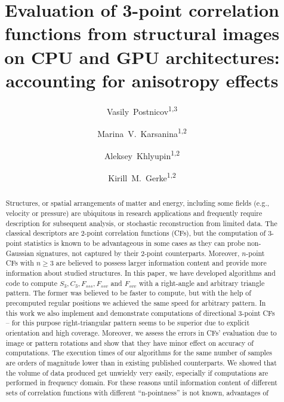 \documentclass[reprint,amsmath,amssymb,aps,pre,showkeys,showpacs]{revtex4-1}
\begin{document}

\author{Vasily~Postnicov\textsuperscript{1,3}}
\author{Marina~V.~Karsanina\textsuperscript{1,2}}
\author{Aleksey~Khlyupin\textsuperscript{1,2}}
\author{Kirill~M.~Gerke\textsuperscript{1,2}}


\title{Evaluation of 3-point correlation functions from structural images on CPU
  and GPU architectures: accounting for anisotropy effects}

\begin{abstract}
Structures, or spatial arrangements of matter and energy, including some fields
(e.g., velocity or pressure) are ubiquitous in research applications and
frequently require description for subsequent analysis, or stochastic
reconstruction from limited data.  The classical descriptors are 2-point
correlation functions (CFs), but the computation of 3-point statistics is known
to be advantageous in some cases as they can probe non-Gaussian signatures, not
captured by their 2-point counterparts. Moreover, $n$-point CFs with $n \ge 3$
are believed to possess larger information content and provide more information
about studied structures. In this paper, we have developed algorithms and code
to compute $S_3, C_3, F_{sss}, F_{ssv}$ and $F_{svv}$ with a right-angle and
arbitrary triangle pattern. The former was believed to be faster to compute, but
with the help of precomputed regular positions we achieved the same speed for
arbitrary pattern. In this work we also implement and demonstrate computations
of directional 3-point CFs -- for this purpose right-triangular pattern seems to
be superior due to explicit orientation and high coverage.  Moreover, we assess
the errors in CFs' evaluation due to image or pattern rotations and show that
they have minor effect on accuracy of computations.  The execution times of our
algorithms for the same number of samples are orders of magnitude lower than in
existing published counterparts. We showed that the volume of data produced get
unwieldy very easily, especially if computations are performed in frequency
domain. For these reasons until information content of different sets of
correlation functions with different ``n-pointness'' is not known, advantages of

\end{abstract}
\end{document}
